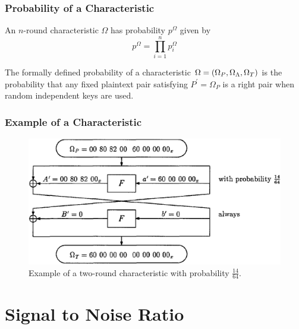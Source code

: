 \documentclass{beamer}
\begin{document}
	\begin{frame}
		\frametitle{Probability of a Characteristic}
		\begin{definition}
			An \(n\)-round characteristic \(\Omega\) has probability
			\(p^\Omega\) given by
			\begin{equation}
				p^\Omega = \prod_{i=1}^n p_i^\Omega
				\label{eq:prob-char}
			\end{equation}
		\end{definition}
		\pause
		\begin{theorem}
			The formally defined probability of a characteristic \(\Omega =
			(\Omega_P, \Omega_\Lambda, \Omega_T)\) is the probability that
			any fixed plaintext pair satisfying \(P^\prime = \Omega_P\) is a
			right pair when random independent keys are used.
		\end{theorem}
	\end{frame}

	\begin{frame}
		\frametitle{Example of a Characteristic}
		\begin{figure}[!ht]
			\centering
			\includegraphics[width=0.9\linewidth]{images/des_char.png}
			\caption{Example of a two-round characteristic with probability \(\frac{14}{64}\).}
			\label{fig:des-char-example}
		\end{figure}
	\end{frame}

	\section{Signal to Noise Ratio}
	
\end{document}

